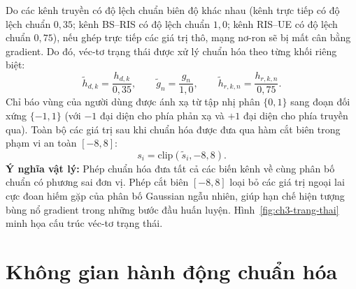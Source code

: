 Do các kênh truyền có độ lệch chuẩn biên độ khác nhau (kênh trực tiếp có độ lệch chuẩn $0,35$; kênh BS--RIS có
độ lệch chuẩn $1,0$; kênh RIS--UE có độ lệch chuẩn $0,75$), nếu ghép trực tiếp các giá trị thô, mạng nơ-ron sẽ
bị mất cân bằng gradient. Do đó, véc-tơ trạng thái được xử lý chuẩn hóa theo từng khối riêng biệt:
\begin{equation}
\tilde{h}_{d,k} = \frac{h_{d,k}}{0,35}, \qquad \tilde{g}_n = \frac{g_n}{1,0}, \qquad
\tilde{h}_{r,k,n} = \frac{h_{r,k,n}}{0,75}.
\label{eq:chuan-hoa-khoi}
\end{equation}
Chỉ báo vùng của người dùng được ánh xạ từ tập nhị phân $\{0, 1\}$ sang đoạn đối xứng $\{-1, 1\}$ (với $-1$ đại
diện cho phía phản xạ và $+1$ đại diện cho phía truyền qua). Toàn bộ các giá trị sau khi chuẩn hóa được đưa qua
hàm cắt biên trong phạm vi an toàn $[-8, 8]$:
\begin{equation}
s_i = \mathrm{clip}(\tilde{s}_i, -8, 8).
\label{eq:cat-bien}
\end{equation}
\textbf{Ý nghĩa vật lý:} Phép chuẩn hóa đưa tất cả các biến kênh về cùng phân bố chuẩn có phương sai đơn vị.
Phép cắt biên $[-8, 8]$ loại bỏ các giá trị ngoại lai cực đoan hiếm gặp của phân bố Gaussian ngẫu nhiên, giúp
hạn chế hiện tượng bùng nổ gradient trong những bước đầu huấn luyện. Hình~\ref{fig:ch3-trang-thai} minh họa
cấu trúc véc-tơ trạng thái.



\section{Không gian hành động chuẩn hóa}
\label{sec:khong-gian-hanh-dong}

